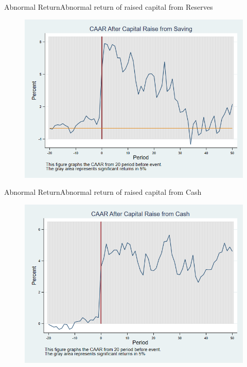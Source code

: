 \documentclass{beamer}
\begin{document}
	
	
	\begin{frame}{Abnormal Return}{Abnormal return of raised capital from Reserves}
		\label{abreturnsaving}
		\begin{figure}
			\centering
			\includegraphics[width=0.65\linewidth]{Output/CARSaving.png}
			\label{fig:abreturnsaving}
		\end{figure}
		
		\hfill\hyperlink{abreturnsaving4Factor}{}
	\end{frame}
	
	
	
	
	\begin{frame}{Abnormal Return}{Abnormal return of raised capital from Cash}
		\label{abreturncash}
		\begin{figure}
			\centering
			\includegraphics[width=0.65\linewidth]{Output/CARCash.png}
			\label{fig:abreturncash}
		\end{figure}
		\hfill\hyperlink{abreturncash4Factor}{}
	\end{frame}
	
	
	
	
	
\end{document}
